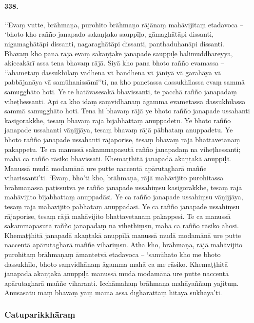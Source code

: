 \paragraph{338.} ‘‘Evaṃ vutte, brāhmaṇa, purohito brāhmaṇo rājānaṃ mahāvijitaṃ etadavoca – ‘bhoto kho rañño janapado sakaṇṭako sauppīḷo, gāmaghātāpi dissanti, nigamaghātāpi dissanti, nagaraghātāpi dissanti, panthaduhanāpi dissanti. Bhavaṃ kho pana rājā evaṃ sakaṇṭake janapade sauppīḷe balimuddhareyya, akiccakārī assa tena bhavaṃ rājā. Siyā kho pana bhoto rañño evamassa – ‘‘ahametaṃ dassukhīlaṃ vadhena vā bandhena vā jāniyā vā garahāya vā pabbājanāya vā samūhanissāmī’’ti, na kho panetassa dassukhīlassa evaṃ sammā samugghāto hoti. Ye te hatāvasesakā bhavissanti, te pacchā rañño janapadaṃ viheṭhessanti. Api ca kho idaṃ saṃvidhānaṃ āgamma evametassa dassukhīlassa sammā samugghāto hoti. Tena hi bhavaṃ rājā ye bhoto rañño janapade ussahanti kasigorakkhe, tesaṃ bhavaṃ rājā bījabhattaṃ anuppadetu. Ye bhoto rañño janapade ussahanti vāṇijjāya, tesaṃ bhavaṃ rājā pābhataṃ anuppadetu. Ye bhoto rañño janapade ussahanti rājaporise, tesaṃ bhavaṃ rājā bhattavetanaṃ pakappetu. Te ca manussā sakammapasutā rañño janapadaṃ na viheṭhessanti; mahā ca rañño rāsiko bhavissati. Khemaṭṭhitā janapadā akaṇṭakā anuppīḷā. Manussā mudā modamānā ure putte naccentā apārutagharā maññe viharissantī’ti. ‘Evaṃ, bho’ti kho, brāhmaṇa, rājā mahāvijito purohitassa brāhmaṇassa paṭissutvā ye rañño janapade ussahiṃsu kasigorakkhe, tesaṃ rājā mahāvijito bījabhattaṃ anuppadāsi. Ye ca rañño janapade ussahiṃsu vāṇijjāya, tesaṃ rājā mahāvijito pābhataṃ anuppadāsi. Ye ca rañño janapade ussahiṃsu rājaporise, tesaṃ rājā mahāvijito bhattavetanaṃ pakappesi. Te ca manussā sakammapasutā rañño janapadaṃ na viheṭhiṃsu, mahā ca rañño rāsiko ahosi. Khemaṭṭhitā janapadā akaṇṭakā anuppīḷā manussā mudā modamānā ure putte naccentā apārutagharā maññe vihariṃsu. Atha kho, brāhmaṇa, rājā mahāvijito purohitaṃ brāhmaṇaṃ āmantetvā etadavoca – ‘samūhato kho me bhoto dassukhīlo, bhoto saṃvidhānaṃ āgamma mahā ca me rāsiko. Khemaṭṭhitā janapadā akaṇṭakā anuppīḷā manussā mudā modamānā ure putte naccentā apārutagharā maññe viharanti. Icchāmahaṃ brāhmaṇa mahāyaññaṃ yajituṃ. Anusāsatu maṃ bhavaṃ yaṃ mama assa dīgharattaṃ hitāya sukhāyā’ti.

\subsubsection{Catuparikkhāraṃ}

